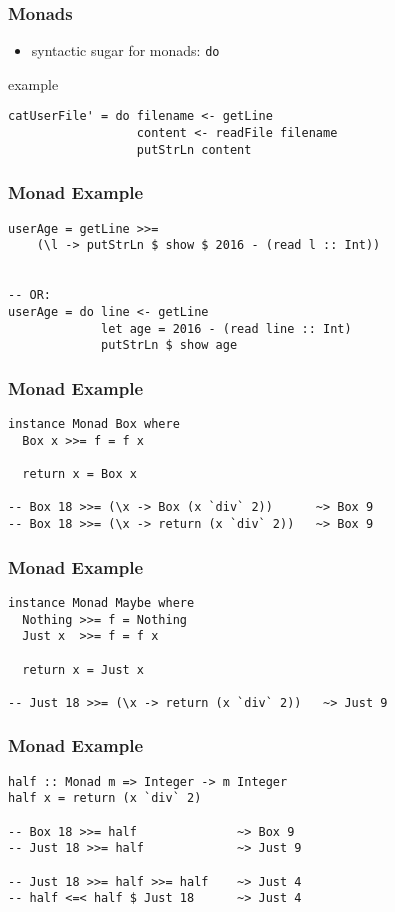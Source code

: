 \documentclass[dvipsnames]{beamer}
\theoremstyle{plain}
\begin{document}
\begin{frame}[fragile]
  \frametitle{Monads}

  \begin{itemize}
    \item syntactic sugar for monads: \lstinline|do|
  \end{itemize}

  \begin{exampleblock}{example}
    \begin{lstlisting}
catUserFile' = do filename <- getLine
                  content <- readFile filename
                  putStrLn content
    \end{lstlisting}
  \end{exampleblock}
\end{frame}

\begin{frame}[fragile]
  \frametitle{Monad Example}

  \begin{lstlisting}
userAge = getLine >>=
    (\l -> putStrLn $ show $ 2016 - (read l :: Int))


-- OR:
userAge = do line <- getLine
             let age = 2016 - (read line :: Int)
             putStrLn $ show age
  \end{lstlisting}
\end{frame}

\begin{frame}[fragile]
  \frametitle{Monad Example}

  \begin{lstlisting}
instance Monad Box where
  Box x >>= f = f x

  return x = Box x

-- Box 18 >>= (\x -> Box (x `div` 2))      ~> Box 9
-- Box 18 >>= (\x -> return (x `div` 2))   ~> Box 9
  \end{lstlisting}
\end{frame}

\begin{frame}[fragile]
  \frametitle{Monad Example}

  \begin{lstlisting}
instance Monad Maybe where
  Nothing >>= f = Nothing
  Just x  >>= f = f x

  return x = Just x

-- Just 18 >>= (\x -> return (x `div` 2))   ~> Just 9
  \end{lstlisting}
\end{frame}

\begin{frame}[fragile]
  \frametitle{Monad Example}

  \begin{lstlisting}
half :: Monad m => Integer -> m Integer
half x = return (x `div` 2)

-- Box 18 >>= half              ~> Box 9
-- Just 18 >>= half             ~> Just 9

-- Just 18 >>= half >>= half    ~> Just 4
-- half <=< half $ Just 18      ~> Just 4
  \end{lstlisting}
\end{frame}
\end{document}

